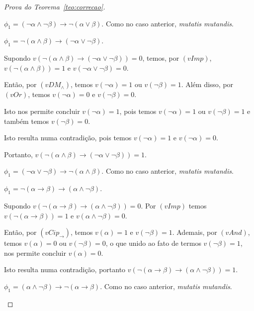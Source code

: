 \begin{proof}[Prova do Teorema~\ref{teo:correcao}]
\begin{provaporcasos}
\begin{provaporsubcasos}
                \subcasodeprova{} $\phi_{1} = (\neg \alpha \land \neg \beta) \to \neg (\alpha \lor \beta)$. Como no caso anterior, \textit{mutatis mutandis}.

                \subcasodeprova{} $\phi_{1} = \neg(\alpha \land \beta) \to (\neg \alpha \lor \neg \beta)$. 
                
                Supondo $v(\neg(\alpha \land \beta) \to (\neg \alpha \lor \neg \beta)) = 0$, temos, por $(vImp)$, $v(\neg(\alpha \land \beta)) = 1$ e $v(\neg \alpha \lor \neg \beta) = 0$. 
                
                Então, por $(vDM_{\land})$, temos $v(\neg \alpha) = 1$ ou $v(\neg \beta) = 1$. Além disso, por $(vOr)$, temos $v(\neg \alpha) = 0$ e $v(\neg \beta) = 0$. 
                
                Isto nos permite concluir $v(\neg \alpha) = 1$, pois temos $v(\neg \alpha) = 1$ ou $v(\neg \beta) = 1$ e também temos $v(\neg \beta) = 0$. 
                
                Isto resulta numa contradição, pois temos $v(\neg \alpha) = 1$ e $v(\neg \alpha) = 0$. 
                
                Portanto, $v(\neg(\alpha \land \beta) \to (\neg \alpha \lor \neg \beta)) = 1$.

                \subcasodeprova{} $\phi_{1} = (\neg \alpha \lor \neg \beta) \to \neg (\alpha \land \beta)$. Como no caso anterior, \textit{mutatis mutandis}.

                \subcasodeprova{} $\phi_{1} = \neg (\alpha \to \beta) \to(\alpha \land \neg \beta)$. 
                
                Supondo $v(\neg (\alpha \to \beta) \to (\alpha \land \neg \beta)) = 0$. Por $(vImp)$ temos $v(\neg (\alpha \to \beta)) = 1$ e $v(\alpha \land \neg \beta) = 0$. 
                
                Então, por $(vCip_{\to})$, temos $v(\alpha) = 1$ e $v(\neg \beta) = 1$. Ademais, por $(vAnd)$, temos $v(\alpha) = 0$ ou $v(\neg \beta) = 0$, o que unido ao fato de termos $v(\neg \beta) = 1$, nos permite concluir $v(\alpha) = 0$. 
                
                Isto resulta numa contradição, portanto $v(\neg (\alpha \to \beta) \to (\alpha \land \neg \beta)) = 1$.

                \subcasodeprova{} $\phi_{1} = (\alpha \land \neg \beta) \to \neg(\alpha \to \beta)$. Como no caso anterior, \textit{mutatis mutandis}.
                

\end{provaporsubcasos}
\end{provaporcasos}
\end{proof}
